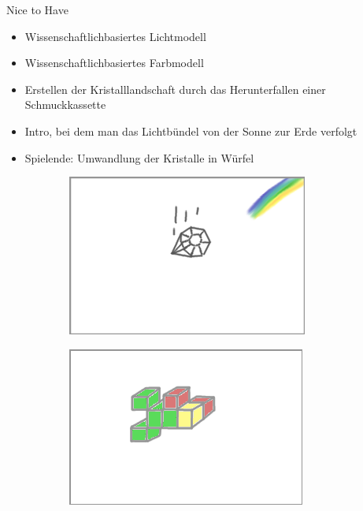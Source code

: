 \slideonetoone
{Nice to Have}
{
	\begin{itemize}
		\item Wissenschaftlichbasiertes Lichtmodell 
		\item Wissenschaftlichbasiertes Farbmodell
		\item Erstellen der Kristalllandschaft durch das Herunterfallen einer Schmuckkassette
		\item Intro, bei dem man das Lichtbündel von der Sonne zur Erde verfolgt
		\item Spielende: Umwandlung der Kristalle in Würfel
	\end{itemize}
}
{
	\begin{figure}
		\centering
		\begin{subfigure}{\textwidth}
			\centering
			\includegraphics[width=\textwidth, height=0.35\textheight, keepaspectratio]{images/Skizzen/intro}
		\end{subfigure}
		\begin{subfigure}{\textwidth}
			\centering
			\includegraphics[width=\textwidth, height=0.35\textheight, keepaspectratio]{images/Skizzen/ende}
		\end{subfigure}
	\end{figure}
}


